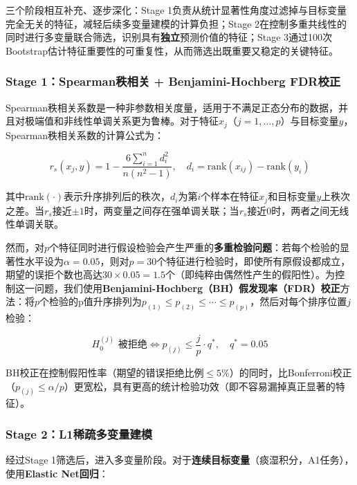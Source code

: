 \documentclass[12pt,a4paper]{ctexart}
\begin{document}
三个阶段相互补充、逐步深化：Stage 1负责从统计显著性角度过滤掉与目标变量完全无关的特征，减轻后续多变量建模的计算负担；Stage 2在控制多重共线性的同时进行多变量联合筛选，识别具有\textbf{独立}预测价值的特征；Stage 3通过100次Bootstrap估计特征重要性的可重复性，从而筛选出既重要又稳定的关键特征。

\subsubsection{Stage 1：Spearman秩相关 + Benjamini-Hochberg FDR校正}

Spearman秩相关系数是一种非参数相关度量，适用于不满足正态分布的数据，并且对极端值和非线性单调关系更为鲁棒。对于特征$x_j$（$j = 1, \ldots, p$）与目标变量$y$，Spearman秩相关系数的计算公式为：

\begin{equation}
r_s(x_j, y) = 1 - \frac{6\sum_{i=1}^{n}d_i^2}{n(n^2 - 1)}, \quad d_i = \text{rank}(x_{ij}) - \text{rank}(y_i)
\label{eq:spearman}
\end{equation}

其中$\text{rank}(\cdot)$表示升序排列后的秩次，$d_i$为第$i$个样本在特征$x_j$和目标变量$y$上秩次之差。当$r_s$接近$\pm 1$时，两变量之间存在强单调关联；当$r_s$接近0时，两者之间无线性单调关联。

然而，对$p$个特征同时进行假设检验会产生严重的\textbf{多重检验问题}：若每个检验的显著性水平设为$\alpha = 0.05$，则对$p = 30$个特征进行检验时，即使所有原假设都成立，期望的误拒个数也高达$30 \times 0.05 = 1.5$个（即纯粹由偶然性产生的假阳性）。为控制这一问题，我们使用\textbf{Benjamini-Hochberg（BH）假发现率（FDR）校正}方法：将$p$个检验的p值升序排列为$p_{(1)} \leq p_{(2)} \leq \cdots \leq p_{(p)}$，然后对每个排序位置$j$检验：

\begin{equation}
H_0^{(j)}\text{ 被拒绝} \iff p_{(j)} \leq \frac{j}{p} \cdot q^*, \quad q^* = 0.05
\label{eq:fdr}
\end{equation}

BH校正在控制假阳性率（期望的错误拒绝比例$\leq 5\%$）的同时，比Bonferroni校正（$p_{(j)} \leq \alpha/p$）更宽松，具有更高的统计检验功效（即不容易漏掉真正显著的特征）。

\subsubsection{Stage 2：L1稀疏多变量建模}

经过Stage 1筛选后，进入多变量阶段。对于\textbf{连续目标变量}（痰湿积分，A1任务），使用\textbf{Elastic Net回归}：
\end{document}
